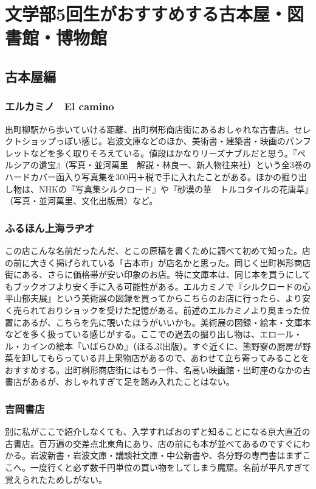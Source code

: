 \section{文学部5回生がおすすめする古本屋・図書館・博物館}\label{sec:huruhonya}

\subsection{古本屋編}
\subsubsection{エルカミノ　El camino}
出町柳駅から歩いていける距離、出町桝形商店街にあるおしゃれな古書店。セレクトショップっぽい感じ。岩波文庫などのほか、美術書・建築書・映画のパンフレットなどを多く取りそろえている。値段はかなりリーズナブルだと思う。『ペルシアの遺宝』（写真・並河萬里　解説・林良一、新人物往来社）という全3巻のハードカバー函入り写真集を300円＋税で手に入れたことがある。ほかの掘り出し物は、NHKの『写真集シルクロード』や『砂漠の華　トルコタイルの花唐草』（写真・並河萬里、文化出版局）など。

\subsubsection{ふるほん上海ラヂオ}
この店こんな名前だったんだ、とこの原稿を書くために調べて初めて知った。店の前に大きく掲げられている「古本市」が店名かと思った。同じく出町桝形商店街にある、さらに価格帯が安い印象のお店。特に文庫本は、同じ本を買うにしてもブックオフより安く手に入る可能性がある。エルカミノで『シルクロードの心　平山郁夫展』という美術展の図録を買ってからこちらのお店に行ったら、より安く売られておりショックを受けた記憶がある。前述のエルカミノより奥まった位置にあるが、こちらを先に覗いたほうがいいかも。美術展の図録・絵本・文庫本などを多く扱っている感じがする。ここでの過去の掘り出し物は、エロール・ル・カインの絵本『いばらひめ』（ほるぷ出版）。すぐ近くに、熊野寮の厨房が野菜を卸してもらっている井上果物店があるので、あわせて立ち寄ってみることをおすすめする。出町桝形商店街にはもう一件、名高い映画館・出町座のなかの古書店があるが、おしゃれすぎて足を踏み入れたことはない。

\subsubsection{吉岡書店}
別に私がここで紹介しなくても、入学すればおのずと知ることになる京大直近の古書店。百万遍の交差点北東角にあり、店の前にも本が並べてあるのですぐにわかる。岩波新書・岩波文庫・講談社文庫・中公新書や、各分野の専門書はまずここへ。一度行くと必ず数千円単位の買い物をしてしまう魔窟。名前が平凡すぎて覚えられたためしがない。

